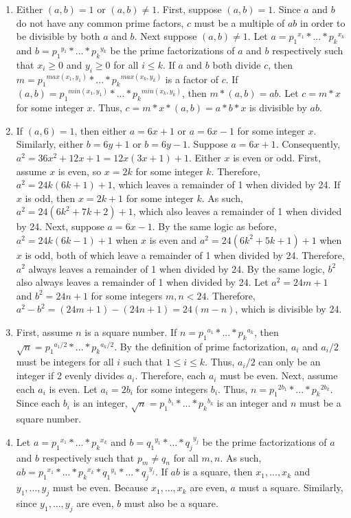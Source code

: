 \documentclass{article}
\begin{document}
\begin{enumerate}
\item Either $(a,b) = 1$ or $(a, b) \neq 1$.  First, suppose $(a, b) = 1$.  Since $a$ and $b$ do not have any common prime factors, $c$ must be a multiple of $ab$ in order to be divisible by both $a$ and $b$.  Next suppose $(a, b) \neq 1$.  Let $a = {p_1}^{x_1} * ... * {p_k}^{x_k}$ and $b = {p_1}^{y_1} * ... * {p_k}^{y_k}$ be the prime factorizations of $a$ and $b$ respectively such that $x_i \geq 0$ and $y_i \geq 0$ for all $i \leq k$.  If $a$ and $b$ both divide $c$, then $m = {p_1}^{max(x_1, y_1)} * ... * {p_k}^{max(x_k, y_k)}$ is a factor of $c$.  If $(a,b) = {p_1}^{min(x_1, y_1)} * ... * {p_k}^{min(x_k, y_k)}$, then  $m * (a,b) = ab$.  Let $c = m*x$ for some integer $x$.  Thus, $c = m*x*(a,b) = a*b*x$ is divisible by $ab$.

\item If $(a, 6) = 1$, then either $a = 6x + 1$ or $a = 6x - 1$ for some integer $x$.  Similarly, either $b = 6y + 1$ or $b = 6y - 1$.  Suppose $a = 6x + 1$.  Consequently, $a^2 = 36x^2 + 12x + 1 = 12x(3x + 1) + 1$.  Either $x$ is even or odd.  First, assume $x$ is even, so $x = 2k$ for some integer $k$.  Therefore, $a^2 = 24k(6k+1) + 1$, which leaves a remainder of 1 when divided by 24.  If $x$ is odd, then $x = 2k+1$ for some integer $k$.  As such, $a^2 = 24(6k^2 + 7k + 2) + 1$, which also leaves a remainder of 1 when divided by 24.  Next, suppose $a = 6x - 1$.  By the same logic as before, $a^2 = 24k(6k - 1) + 1$ when $x$ is even and $a^2 = 24(6k^2 + 5k +1) + 1$ when $x$ is odd, both of which leave a remainder of 1 when divided by 24.  Therefore, $a^2$ always leaves a remainder of 1 when divided by 24.  By the same logic, $b^2$ also always leaves a remainder of 1 when divided by 24.  Let $a^2 = 24m + 1$ and $b^2 = 24n + 1$ for some integers $m, n < 24$.  Therefore, $a^2 - b^2 = (24m + 1) - (24n + 1) = 24(m-n)$, which is divisible by 24.

\item First, assume $n$ is a square number.  If $n = {p_1}^{a_1} * ... * {p_k}^{a_k}$, then $\sqrt n = {p_1}^{a_1/2} * ... * {p_k}^{a_k/2}$.  By the definition of prime factorization, $a_i$ and $a_i/2$ must be integers for all $i$ such that $1 \leq i \leq k$.  Thus, $a_i/2$ can only be an integer if 2 evenly divides $a_i$.  Therefore, each $a_i$ must be even.  Next, assume each $a_i$ is even.  Let $a_i = 2b_i$ for some integers $b_i$.  Thus, $n = {p_1}^{2b_1} * ... * {p_k}^{2b_k}$.  Since each $b_i$ is an integer, $\sqrt n = {p_1}^{b_1} * ... * {p_k}^{b_k}$ is an integer and $n$ must be a square number.

\item Let $a = {p_1}^{x_1} * ... * {p_k}^{x_k}$ and $b = {q_1}^{y_1} * ... * {q_j}^{y_j}$ be the prime factorizations of $a$ and $b$ respectively such that $p_m \neq q_n$ for all $m, n$.  As such, $ab = {p_1}^{x_1} * ... * {p_k}^{x_k} * {q_1}^{y_1} * ... * {q_j}^{y_j}$.  If $ab$ is a square, then $x_1, ..., x_k$ and $y_1, ..., y_j$ must be even.  Because $x_1, ..., x_k$ are even, $a$ must a square.  Similarly, since $y_1, ..., y_j$ are even, $b$ must also be a square.

\end{enumerate}
\end{document}
